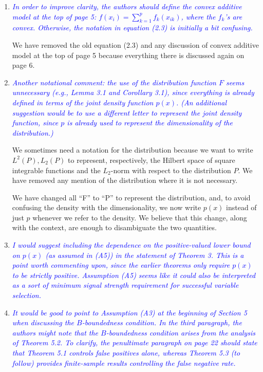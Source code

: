 \documentclass[pdftex,12pt]{article}
\def\rc#1{{\it\textcolor{blue}{#1}}\smallskip}
\begin{document}
\begin{enumerate}[(1)]
\item \rc{In order to improve clarity, the authors should define the convex
additive model at the top of page 5: $f(x_i) = \sum_{k=1}^p f_k(x_{ik})$, where the
$f_k$'s are convex.  Otherwise, the notation in equation (2.3) is
initially a bit confusing.}

We have removed the old equation (2.3) and any discussion of convex additive model at the top of page 5 because everything there is discussed again on page 6. 

\item \rc{Another notational comment: the use of the
distribution function $F$ seems unnecessary (e.g., Lemma 3.1 and
Corollary 3.1), since everything is already defined in terms of the
joint density function $p(x)$. (An additional suggestion would be to use
a different letter to represent the joint density function, since $p$ is
already used to represent the dimensionality of the distribution.)}

We sometimes need a notation for the distribution because we want to write $L^2(P), L_2(P)$ to represent, respectively, the Hilbert space of square integrable functions and the $L_2$-norm with respect to the distribution $P$. We have removed any mention of the distribution where it is not necessary.

We have changed all ``F'' to ``P'' to represent the distribution, and, to avoid confusing the density with the dimensionality, we now write $p(x)$ instead of just $p$ whenever we refer to the density. We believe that this change, along with the context, are enough to disambiguate the two quantities. 

\item \rc{I would suggest including the dependence on the positive-valued lower
bound on $p(x)$ (as assumed in (A5)) in the statement of Theorem 3. This
is a point worth commenting upon, since the earlier theorems only
require $p(x)$ to be strictly positive. Assumption (A5) seems like it
could also be interpreted as a sort of minimum signal strength
requirement for successful variable selection.}

\item \rc{It would be good to point to Assumption (A3) at the beginning of
Section 5 when discussing the $B$-boundedness condition. In the third
paragraph, the authors might note that the $B$-boundedness condition
arises from the analysis of Theorem 5.2. To clarify, the penultimate
paragraph on page 22 should state that Theorem 5.1 controls false
positives alone, whereas Theorem 5.3 (to follow) provides
finite-sample results controlling the false negative rate.}


\end{enumerate}
\end{document}
